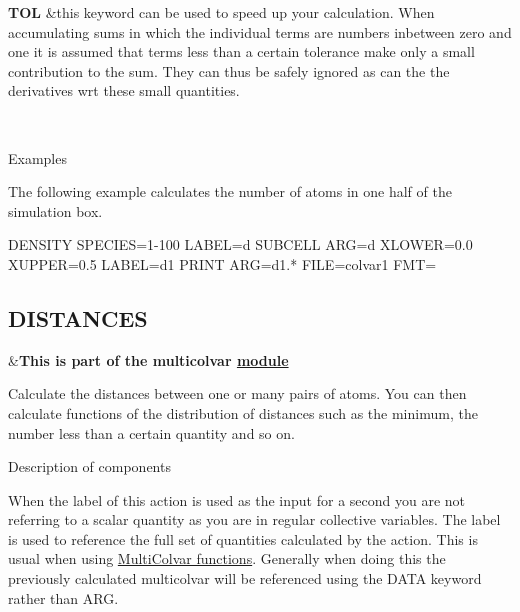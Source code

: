 \begin{TabularC}{2}
\hline
{\bfseries  T\+O\+L } &this keyword can be used to speed up your calculation. When accumulating sums in which the individual terms are numbers inbetween zero and one it is assumed that terms less than a certain tolerance make only a small contribution to the sum. They can thus be safely ignored as can the the derivatives wrt these small quantities.  

\\
\end{TabularC}


\begin{DoxyParagraph}{Examples }

\end{DoxyParagraph}
The following example calculates the number of atoms in one half of the simulation box.

\begin{DoxyVerb}DENSITY SPECIES=1-100 LABEL=d
SUBCELL ARG=d XLOWER=0.0 XUPPER=0.5 LABEL=d1
PRINT ARG=d1.* FILE=colvar1 FMT=%
\end{DoxyVerb}
 \hypertarget{DISTANCES}{}\subsection{D\+I\+S\+T\+A\+N\+C\+E\+S}\label{DISTANCES}
\begin{TabularC}{2}
\hline
&{\bfseries  This is part of the multicolvar \hyperlink{mymodules}{module }}   \\
\end{TabularC}
Calculate the distances between one or many pairs of atoms. You can then calculate functions of the distribution of distances such as the minimum, the number less than a certain quantity and so on.

\begin{DoxyParagraph}{Description of components}

\end{DoxyParagraph}
When the label of this action is used as the input for a second you are not referring to a scalar quantity as you are in regular collective variables. The label is used to reference the full set of quantities calculated by the action. This is usual when using \hyperlink{mcolv_multicolvarfunction}{Multi\+Colvar functions}. Generally when doing this the previously calculated multicolvar will be referenced using the D\+A\+T\+A keyword rather than A\+R\+G.

